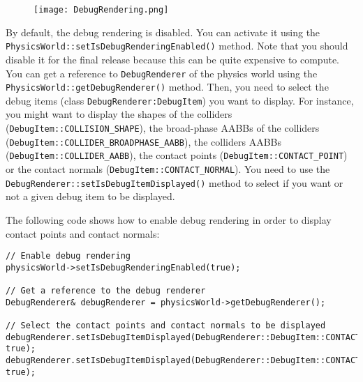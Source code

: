 \documentclass[a4paper,12pt]{article}
\begin{document}
  \begin{figure}[!ht]
      \centering
      \texttt{[image: DebugRendering.png]}
       \label{fig:debugrendering}
  \end{figure}

  \begin{sloppypar}
   By default, the debug rendering is disabled. You can activate it using the \texttt{PhysicsWorld::setIsDebugRenderingEnabled()} method. Note that you
   should disable it for the final release because this can be quite expensive to compute. You can get a reference to \texttt{DebugRenderer} of the physics
   world using the \texttt{PhysicsWorld::getDebugRenderer()} method. Then, you need to select the debug items
   (class \texttt{DebugRenderer:DebugItem}) you want to display. For instance, you might want to display the shapes of the colliders
   (\texttt{DebugItem::COLLISION\_SHAPE}), the broad-phase AABBs of the colliders (\texttt{DebugItem::COLLIDER\_BROADPHASE\_AABB}), the colliders AABBs
   (\texttt{DebugItem::COLLIDER\_AABB}), the contact points (\texttt{DebugItem::CONTACT\_POINT}) or the contact normals (\texttt{DebugItem::CONTACT\_NORMAL}).
   You need to use the \texttt{DebugRenderer::setIsDebugItemDisplayed()} method to select if you want or not a given debug item to be displayed. \\
  \end{sloppypar}

  The following code shows how to enable debug rendering in order to display contact points and contact normals: \\

    \begin{lstlisting}
// Enable debug rendering
physicsWorld->setIsDebugRenderingEnabled(true);

// Get a reference to the debug renderer
DebugRenderer& debugRenderer = physicsWorld->getDebugRenderer();

// Select the contact points and contact normals to be displayed
debugRenderer.setIsDebugItemDisplayed(DebugRenderer::DebugItem::CONTACT_POINT, true);
debugRenderer.setIsDebugItemDisplayed(DebugRenderer::DebugItem::CONTACT_NORMAL, true);
    \end{lstlisting}

   \vspace{0.6cm}
\end{document}
